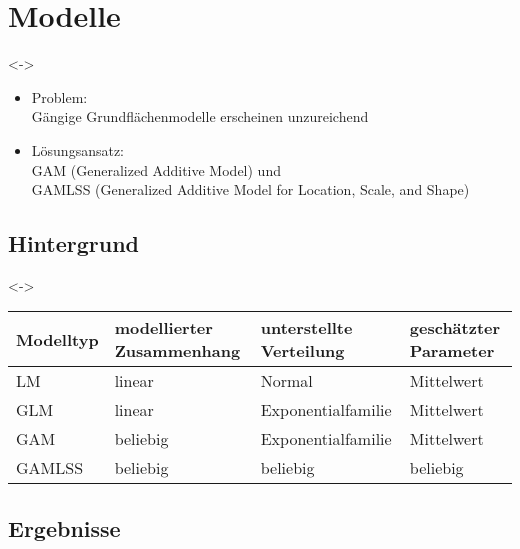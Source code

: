 \section{Modelle}

\begin{frame}[c]
  \visible<\theFirstElement->{
    \begin{itemize}
    \item Problem: \\
      Gängige Grundflächenmodelle erscheinen unzureichend
      
    \item Lösungsansatz: \\
      GAM (Generalized Additive Model) und \\
      GAMLSS (Generalized Additive Model for Location, Scale, and Shape)
    \end{itemize}}
\end{frame}

\subsection{Hintergrund}

\begin{frame}[c]
  \visible<\theFirstElement->{
    {\scriptsize
      \begin{tabular}{l l l l}
      \toprule
      Modelltyp & modellierter Zusammenhang & unterstellte Verteilung & geschätzter Parameter \\
      \midrule
      LM & linear & Normal & Mittelwert \\
      GLM & linear & Exponentialfamilie & Mittelwert \\
      GAM & beliebig & Exponentialfamilie & Mittelwert \\
      GAMLSS & beliebig & beliebig & beliebig \\
      \bottomrule
    \end{tabular}}
  }
\end{frame}

\subsection{Ergebnisse}


